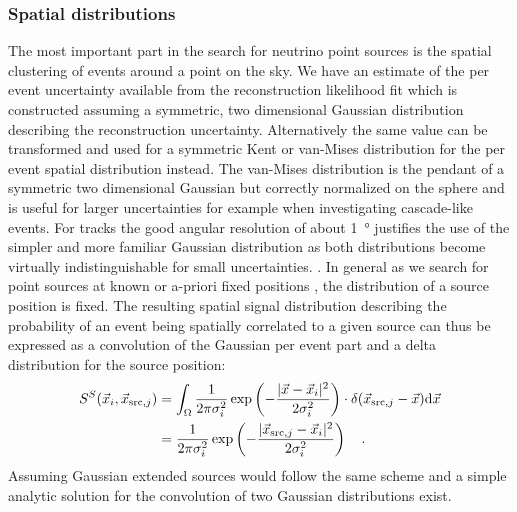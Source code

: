 \subsubsection*{Spatial distributions}
The most important part in the search for neutrino point sources is the spatial clustering of events around a point on the sky.
We have an estimate of the per event uncertainty available from the reconstruction likelihood fit which is constructed assuming a symmetric, two dimensional Gaussian distribution describing the reconstruction uncertainty.
Alternatively the same value can be transformed and used for a symmetric Kent or van-Mises distribution  for the per event spatial distribution instead.
The van-Mises distribution is the pendant of a symmetric two dimensional Gaussian but correctly normalized on the sphere and is useful for larger uncertainties for example when investigating cascade-like events.
For tracks the good angular resolution of about \SI{1}{\degree} justifies the use of the simpler and more familiar Gaussian distribution as both distributions become virtually indistinguishable for small uncertainties.
.
In general as we search for point sources at known or a-priori fixed positions , the distribution of a source position is fixed.
The resulting spatial signal distribution describing the probability of an event being spatially correlated to a given source can thus be expressed as a convolution of the Gaussian per event part and a delta distribution for the source position:
\begin{equation}
  \begin{aligned}
    S^S(\vec{x}_i, \vec{x}_{\mathrm{src},j}) &=
      \int_\Omega \frac{1}{2\pi \sigma_i^2}
      \exp\left(-\frac{|\vec{x}-\vec{x}_i|^2}{2\sigma_i^2}\right) \cdot
      \delta(\vec{x}_{\mathrm{src},j} - \vec{x}) \mathrm{d}\vec{x} \\
      &= \frac{1}{2\pi \sigma_i^2}
         \exp\left(-\frac{|\vec{x}_{\mathrm{src},j}-
                          \vec{x}_i|^2}{2\sigma_i^2}\right)
      \quad\text{.}
  \end{aligned}
\end{equation}
Assuming Gaussian extended sources would follow the same scheme and a simple analytic solution for the convolution of two Gaussian distributions exist.

